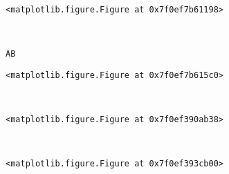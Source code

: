 \documentclass[11pt]{article}
\begin{document}
    
    \begin{center}
    \end{center}
    { \hspace*{\fill} \\}
    
    
    \begin{verbatim}
<matplotlib.figure.Figure at 0x7f0ef7b61198>
    \end{verbatim}

    
    \begin{center}
    \end{center}
    { \hspace*{\fill} \\}
    
    \begin{Verbatim}[commandchars=\\\{\}]
AB

    \end{Verbatim}

    
    \begin{verbatim}
<matplotlib.figure.Figure at 0x7f0ef7b615c0>
    \end{verbatim}

    
    \begin{center}
    \end{center}
    { \hspace*{\fill} \\}
    
    
    \begin{verbatim}
<matplotlib.figure.Figure at 0x7f0ef390ab38>
    \end{verbatim}

    
    \begin{center}
    \end{center}
    { \hspace*{\fill} \\}
    
    
    \begin{verbatim}
<matplotlib.figure.Figure at 0x7f0ef393cb00>
    \end{verbatim}

    
    \begin{center}
    \end{center}
    { \hspace*{\fill} \\}
    
\end{document}
